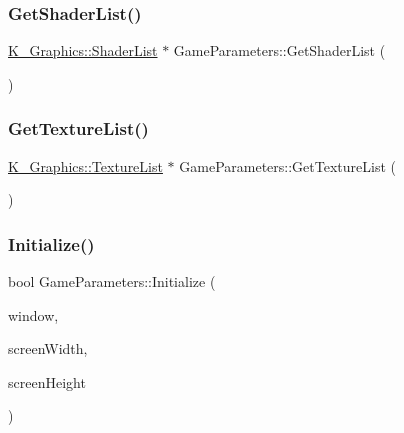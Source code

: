 \mbox{\label{class_game_parameters_aa8d4bcae3fd46636db5e3873d43da1e7}} 
\subsubsection{\texorpdfstring{Get\+Shader\+List()}{GetShaderList()}}
{\footnotesize\ttfamily \mbox{\hyperlink{class_k___graphics_1_1_shader_list}{K\+\_\+\+Graphics\+::\+Shader\+List}} $\ast$ Game\+Parameters\+::\+Get\+Shader\+List (\begin{DoxyParamCaption}{ }\end{DoxyParamCaption})}

\mbox{\label{class_game_parameters_ac8161d1198add063bd00058e40d17bc3}} 
\subsubsection{\texorpdfstring{Get\+Texture\+List()}{GetTextureList()}}
{\footnotesize\ttfamily \mbox{\hyperlink{class_k___graphics_1_1_texture_list}{K\+\_\+\+Graphics\+::\+Texture\+List}} $\ast$ Game\+Parameters\+::\+Get\+Texture\+List (\begin{DoxyParamCaption}{ }\end{DoxyParamCaption})}

\mbox{\label{class_game_parameters_a287904839ed6e402c89b3f3a3ce90f7b}} 
\subsubsection{\texorpdfstring{Initialize()}{Initialize()}}
{\footnotesize\ttfamily bool Game\+Parameters\+::\+Initialize (\begin{DoxyParamCaption}\item[{G\+L\+F\+Wwindow $\ast$}]{window,  }\item[{int}]{screen\+Width,  }\item[{int}]{screen\+Height }\end{DoxyParamCaption})}


